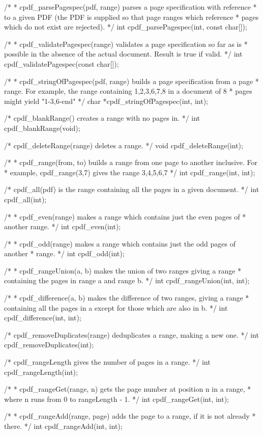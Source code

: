 /*
 * cpdf_parsePagespec(pdf, range) parses a page specification with reference
 * to a given PDF (the PDF is supplied so that page ranges which reference
 * pages which do not exist are rejected).
 */
int cpdf_parsePagespec(int, const char[]);

/*
 * cpdf_validatePagespec(range) validates a page specification so far as is
 * possible in the absence of the actual document. Result is true if valid.
 */
int cpdf_validatePagespec(const char[]);

/*
 * cpdf_stringOfPagespec(pdf, range) builds a page specification from a page
 * range. For example, the range containing 1,2,3,6,7,8 in a document of 8
 * pages might yield "1-3,6-end"
 */
char *cpdf_stringOfPagespec(int, int);

/* cpdf_blankRange() creates a range with no pages in. */
int cpdf_blankRange(void);

/* cpdf_deleteRange(range) deletes a range. */
void cpdf_deleteRange(int);

/*
 * cpdf_range(from, to) builds a range from one page to another inclusive. For
 * example, cpdf_range(3,7) gives the range 3,4,5,6,7
 */
int cpdf_range(int, int);

/* cpdf_all(pdf) is the range containing all the pages in a given document. */
int cpdf_all(int);

/*
 * cpdf_even(range) makes a range which contains just the even pages of
 * another range.
 */
int cpdf_even(int);

/*
 * cpdf_odd(range) makes a range which contains just the odd pages of another
 * range.
 */
int cpdf_odd(int);

/*
 * cpdf_rangeUnion(a, b) makes the union of two ranges giving a range
 * containing the pages in range a and range b.
 */
int cpdf_rangeUnion(int, int);

/*
 * cpdf_difference(a, b) makes the difference of two ranges, giving a range
 * containing all the pages in a except for those which are also in b.
 */
int cpdf_difference(int, int);

/* cpdf_removeDuplicates(range) deduplicates a range, making a new one. */
int cpdf_removeDuplicates(int);

/* cpdf_rangeLength gives the number of pages in a range. */
int cpdf_rangeLength(int);

/*
 * cpdf_rangeGet(range, n) gets the page number at position n in a range,
 * where n runs from 0 to rangeLength - 1.
 */
int cpdf_rangeGet(int, int);

/*
 * cpdf_rangeAdd(range, page) adds the page to a range, if it is not already
 * there.
 */
int cpdf_rangeAdd(int, int);

